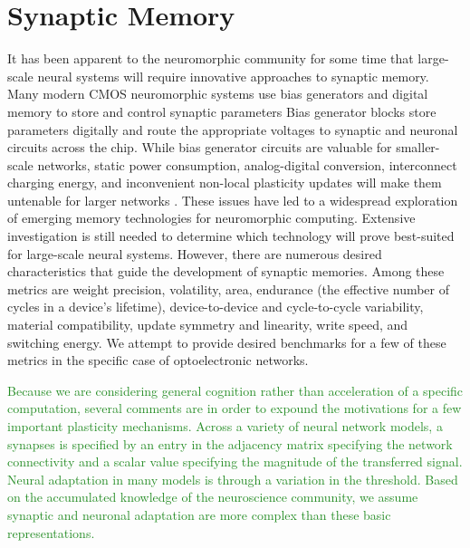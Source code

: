 \documentclass[twocolumn]{article}
\begin{document}
\section{\label{sec:memory}Synaptic Memory}
It has been apparent to the neuromorphic community for some time that large-scale neural systems will require innovative approaches to synaptic memory. Many modern CMOS neuromorphic systems use bias generators and digital memory to store and control synaptic parameters \cite{liu2014event} Bias generator blocks store parameters digitally and route the appropriate voltages to synaptic and neuronal circuits across the chip. While bias generator circuits are valuable for smaller-scale networks, static power consumption, analog-digital conversion, interconnect charging energy, and inconvenient non-local plasticity updates will make them untenable for larger networks \cite{dalgaty2019hybrid}. These issues have led to a widespread exploration of emerging memory technologies for neuromorphic computing. Extensive investigation is still needed to determine which technology will prove best-suited for large-scale neural systems. However, there are numerous desired characteristics that guide the development of synaptic memories. Among these metrics are weight precision, volatility, area, endurance (the effective number of cycles in a device's lifetime), device-to-device and cycle-to-cycle variability, material compatibility, update symmetry and linearity, write speed, and switching energy. We attempt to provide desired benchmarks for a few of these metrics in the specific case of optoelectronic networks.

\textcolor{ForestGreen}{Because we are considering general cognition rather than acceleration of a specific computation, several comments are in order to expound the motivations for a few important plasticity mechanisms. Across a variety of neural network models, a synapses is specified by an entry in the adjacency matrix specifying the network connectivity and a scalar value specifying the magnitude of the transferred signal. Neural adaptation in many models is through a variation in the threshold. Based on the accumulated knowledge of the neuroscience community, we assume synaptic and neuronal adaptation are more complex than these basic representations.}
\end{document}
